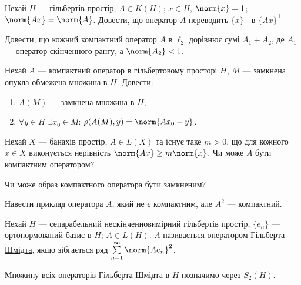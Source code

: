 \begin{exercise}
    Нехай $H$ --- гільбертів простір; $A \in K(H)$; $x \in H$, $\norm{x} = 1$;
    $\norm{Ax} = \norm{A}$. Довести, що оператор $A$ переводить $\{x\}^\perp$
    в $\{Ax\}^\perp$
\end{exercise}

\begin{exercise}
    Довести, що кожний компактний оператор $A$ в $\ell_2$ дорівнює сумі $A_1 + A_2$,
    де $A_1$ --- оператор скінченного рангу, а $\norm{A_2}<1$.
\end{exercise}

\begin{exercise}
    Нехай $A$ --- компактний оператор в гільбертовому просторі $H$, $M$ ---
    замкнена опукла обмежена множина в $H$. Довести:
    \begin{enumerate}
        \item $A(M)$ --- замкнена множина в $H$;
        \item $\forall y \in H$ $\exists x_0 \in M$: $\rho(A(M),y) = \norm{Ax_0 - y}$.
    \end{enumerate}
\end{exercise}

\begin{exercise}
    Нехай $X$ --- банахів простір, $A \in L(X)$ та існує таке $m>0$, що для кожного
    $x \in X$ виконується нерівність $\norm{Ax} \geq m \norm{x}$. Чи може $A$ бути
    компактним оператором?
\end{exercise}

\begin{exercise}
    Чи може образ компактного оператора бути замкненим?
\end{exercise}

\begin{exercise}
    Навести приклад оператора $A$, який не є компактним, але $A^2$ --- компактний.
\end{exercise}

\begin{theory}
    Нехай $H$ --- сепарабельний нескінченновимірний гільбертів простір, $\{e_n\}$ ---
    ортонормований базис в $H$; $A \in L(H)$. $A$ називається \ul{оператором
    Гільберта-Шмідта}, якщо зібгається ряд $\sum\limits^\infty_{n=1} \norm{A e_n}^2$.

    Множину всіх операторів Гільберта-Шмідта в $H$ позначимо через $S_2(H)$. 
\end{theory}